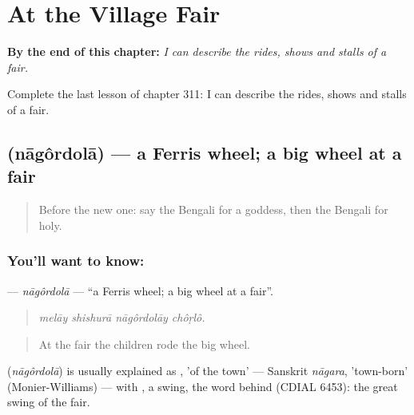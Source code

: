 
\chapter{At the Village Fair}
\label{ch:bn-at-the-village-fair}

\begin{chapteropening}
\textbf{By the end of this chapter:} \emph{I can describe the rides, shows and stalls of a fair.}

Complete the last lesson of chapter 311: I can describe the rides, shows and stalls of a fair.
\end{chapteropening}

\section[\texorpdfstring{\bn{নাগরদোলা} (nāgôrdolā)}{নাগরদোলা (nāgôrdolā)}]{ (nāgôrdolā) — a Ferris wheel; a big wheel at a fair}

\label{lesson:BN-C311-nagordola}



\begin{quote}
Before the new one: say the Bengali for a goddess, then the Bengali for holy.
\end{quote}

\subsection*{You'll want to know: }
\textbf{} — \emph{nāgôrdolā} — \textquotedblleft{}a Ferris wheel; a big wheel at a fair\textquotedblright{}.

\begin{quote}
   
\end{quote}

\begin{quote}
\emph{melāy shishurā nāgôrdolāy chôṛlô.}
\end{quote}

\begin{quote}
At the fair the children rode the big wheel.
\end{quote}

\begin{cousinweb}
\textbf{} (\emph{nāgôrdolā}) is usually explained as , 'of the town' — Sanskrit \emph{nāgara}, 'town-born' (Monier-Williams) — with , a swing, the word behind \textbf{} (CDIAL 6453): the great swing of the fair.
\end{cousinweb}

